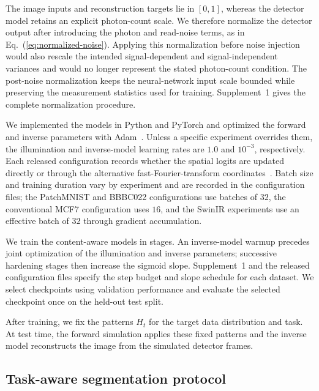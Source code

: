 \documentclass{optica-article}
\begin{document}
The image inputs and reconstruction targets lie in $[0,1]$, whereas the detector model retains an explicit photon-count scale. We therefore normalize the detector output after introducing the photon and read-noise terms, as in Eq.~(\ref{eq:normalized-noise}). Applying this normalization before noise injection would also rescale the intended signal-dependent and signal-independent variances and would no longer represent the stated photon-count condition. The post-noise normalization keeps the neural-network input scale bounded while preserving the measurement statistics used for training. Supplement~1 gives the complete normalization procedure.

We implemented the models in Python and PyTorch and optimized the forward and inverse parameters with Adam~\cite{kingma2014adam}. Unless a specific experiment overrides them, the illumination and inverse-model learning rates are $1.0$ and $10^{-3}$, respectively. Each released configuration records whether the spatial logits are updated directly or through the alternative fast-Fourier-transform coordinates~\cite{rao2010fast}. Batch size and training duration vary by experiment and are recorded in the configuration files; the PatchMNIST and BBBC022 configurations use batches of $32$, the conventional MCF7 configuration uses $16$, and the SwinIR experiments use an effective batch of $32$ through gradient accumulation.

We train the content-aware models in stages. An inverse-model warmup precedes joint optimization of the illumination and inverse parameters; successive hardening stages then increase the sigmoid slope. Supplement~1 and the released configuration files specify the step budget and slope schedule for each dataset. We select checkpoints using validation performance and evaluate the selected checkpoint once on the held-out test split.

After training, we fix the patterns $H_t$ for the target data distribution and task. At test time, the forward simulation applies these fixed patterns and the inverse model reconstructs the image from the simulated detector frames.

\subsection{Task-aware segmentation protocol}
\label{sec:task-aware-protocol}
\end{document}
